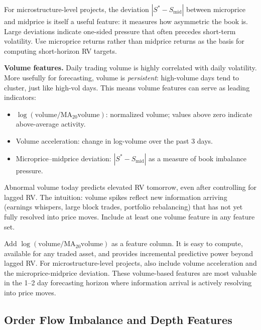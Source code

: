 \begin{projectconnection}
For microstructure-level projects, the deviation $|S^* - S_{\text{mid}}|$ between microprice and midprice is itself a useful feature: it measures how asymmetric the book is. Large deviations indicate one-sided pressure that often precedes short-term volatility. Use microprice returns rather than midprice returns as the basis for computing short-horizon RV targets.
\end{projectconnection}

\textbf{Volume features.}
Daily trading volume is highly correlated with daily volatility.
More usefully for forecasting, volume is \emph{persistent}: high-volume days tend to cluster, just like high-vol days.
This means volume features can serve as leading indicators:
\begin{itemize}[nosep]
  \item $\log(\text{volume}/\text{MA}_{20}\text{volume})$: normalized volume; values above zero indicate above-average activity.
  \item Volume acceleration: change in log-volume over the past 3 days.
  \item Microprice--midprice deviation: $|S^* - S_{\text{mid}}|$ as a measure of book imbalance pressure.
\end{itemize}

\begin{keyidea}
Abnormal volume today predicts elevated RV tomorrow, even after controlling for lagged RV.
The intuition: volume spikes reflect new information arriving (earnings whispers, large block trades, portfolio rebalancing) that has not yet fully resolved into price moves.
Include at least one volume feature in any feature set.
\end{keyidea}

\begin{projectconnection}
Add $\log(\text{volume}/\text{MA}_{20}\text{volume})$ as a feature column. It is easy to compute, available for any traded asset, and provides incremental predictive power beyond lagged RV. For microstructure-level projects, also include volume acceleration and the microprice-midprice deviation. These volume-based features are most valuable in the 1--2 day forecasting horizon where information arrival is actively resolving into price moves.
\end{projectconnection}

\subsection{Order Flow Imbalance and Depth Features}\label{sec:feat-ofi}

